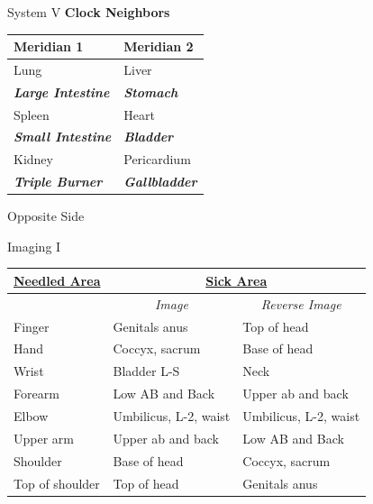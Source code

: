 \documentclass{beamer}
\begin{document}
\begin{frame}{System V}
  \textbf{\Large Clock Neighbors}

  \begin{table}[]
    \begin{tabular}{@{}ll@{}}
      \toprule
      Meridian 1                        & Meridian 2                    \\ \midrule
      Lung                              & Liver                         \\
      \textit{\textbf{Large Intestine}} & \textit{\textbf{Stomach}}     \\
      Spleen                            & Heart                         \\
      \textit{\textbf{Small Intestine}} & \textit{\textbf{Bladder}}     \\
      Kidney                            & Pericardium                   \\
      \textit{\textbf{Triple Burner}}   & \textit{\textbf{Gallbladder}} \\ \bottomrule
    \end{tabular}
  \end{table}
  
  \begin{ns}
    Opposite Side
  \end{ns}
\end{frame}

\begin{frame}{Imaging I}
  \begin{table}[]
    \begin{tabular}{l|ll}
      {\ul \textbf{Needled Area}} & \multicolumn{2}{c}{{\ul \textbf{Sick Area}}}                                    \\ \hline
      & \multicolumn{1}{c}{\textit{Image}} & \multicolumn{1}{c}{\textit{Reverse Image}} \\
      Finger                      & Genitals anus                      & Top of head                                \\
      Hand                        & Coccyx, sacrum                     & Base of head                               \\
      Wrist                       & Bladder L-S                        & Neck                                       \\
      Forearm                     & Low AB and Back                    & Upper ab and back                          \\
      Elbow                       & Umbilicus, L-2, waist              & Umbilicus, L-2, waist                      \\
      Upper arm                   & Upper ab and back                  & Low AB and Back                            \\
      Shoulder                    & Base of head                       & Coccyx, sacrum                             \\
      Top of shoulder             & Top of head                        & Genitals anus                             
    \end{tabular}
  \end{table}
\end{frame}
\end{document}
